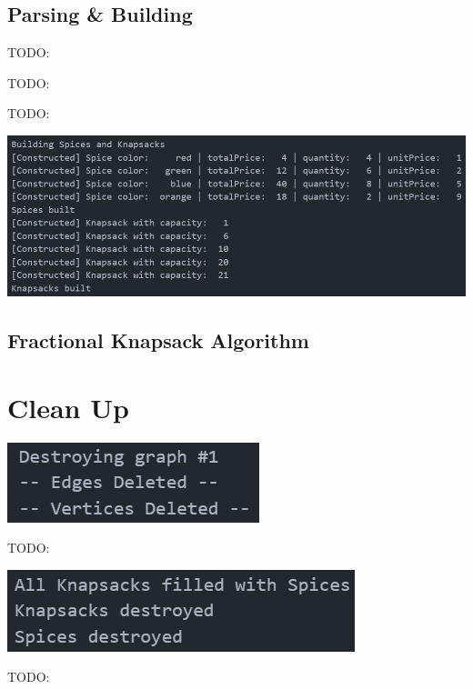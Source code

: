 \documentclass[12pt, letterpaper]{article}
\begin{document}
\subsection{Parsing \& Building} \label{SpiceKnapsack_ParseBuild}
TODO:
\begin{center}
   
\end{center}
TODO:
\begin{center}
   
\end{center}
TODO:
\begin{center}
   \includegraphics{images/SpiceKnapsack_ParseBuild.png}
\end{center}

\subsection{Fractional Knapsack Algorithm} \label{SpiceKnapsack_FKA}

\section{Clean Up} \label{CleanUp}
\begin{center}
   \includegraphics{images/Graph1_CleanUp.png}
\end{center}
TODO:
\begin{center}
   \includegraphics{images/SpiceKnapsack_CleanUp.png}
\end{center}
TODO:
\end{document}
